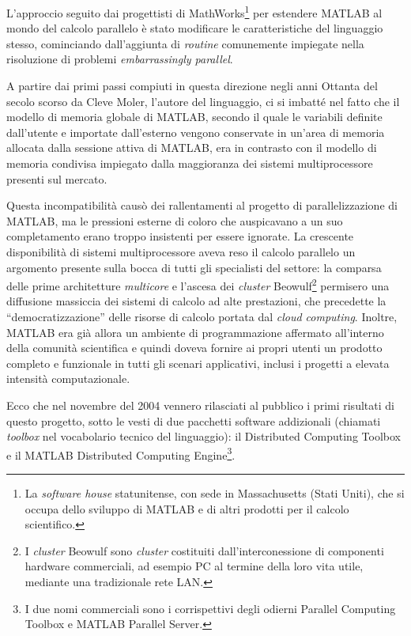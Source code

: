 L'approccio seguito dai progettisti di MathWorks\textsuperscript{\textregistered}\footnote{La \textit{software house} statunitense, con sede in Massachusetts (Stati Uniti), che si occupa dello sviluppo di MATLAB e di altri prodotti per il calcolo scientifico.}
per estendere MATLAB al mondo del calcolo parallelo \`e stato modificare le caratteristiche del linguaggio
stesso, cominciando dall'aggiunta di \textit{routine} comunemente impiegate nella risoluzione di problemi \textit{embarrassingly parallel}.

A partire dai primi passi compiuti in questa direzione negli anni Ottanta del secolo scorso da Cleve Moler, l'autore del linguaggio, ci si imbatt\'e
nel fatto che il modello di memoria globale di MATLAB, secondo il quale le variabili definite dall'utente e importate dall'esterno vengono conservate
in un'area di memoria allocata dalla sessione attiva di MATLAB, era in contrasto con il modello di memoria condivisa impiegato dalla maggioranza dei sistemi
multiprocessore presenti sul mercato.

Questa incompatibilit\`a causò dei rallentamenti al progetto di parallelizzazione di MATLAB, ma le pressioni esterne di coloro che auspicavano a un suo completamento erano troppo insistenti per essere ignorate.\newline
La crescente disponibilit\`a di sistemi multiprocessore aveva reso il calcolo parallelo un argomento presente sulla bocca di tutti gli specialisti del
settore: la comparsa delle prime architetture \textit{multicore} e l'ascesa dei \textit{cluster} Beowulf\footnote{I \textit{cluster} Beowulf sono \textit{cluster} costituiti dall'interconessione di componenti hardware commerciali, ad esempio PC al termine della loro vita utile, mediante una tradizionale rete LAN. } permisero una diffusione massiccia dei sistemi di calcolo ad alte prestazioni, che precedette la \enquote{democratizzazione} delle risorse di calcolo portata dal \textit{cloud computing}.\newline
Inoltre, MATLAB era gi\`a allora un ambiente di programmazione affermato all'interno della comunit\`a scientifica e quindi doveva fornire ai propri utenti un prodotto completo e funzionale
in tutti gli scenari applicativi, inclusi i progetti a elevata intensit\`a computazionale.

Ecco che nel novembre del 2004 vennero rilasciati al pubblico i primi risultati di questo progetto, sotto le vesti di due pacchetti software addizionali (chiamati \textit{toolbox} nel vocabolario tecnico del linguaggio): il Distributed Computing
Toolbox\textsuperscript{\texttrademark} e il MATLAB Distributed Computing Engine\textsuperscript{\texttrademark}\footnote{I due nomi commerciali sono i corrispettivi degli odierni Parallel
    Computing Toolbox\textsuperscript{\texttrademark} e MATLAB Parallel Server\textsuperscript{\texttrademark}.}.

